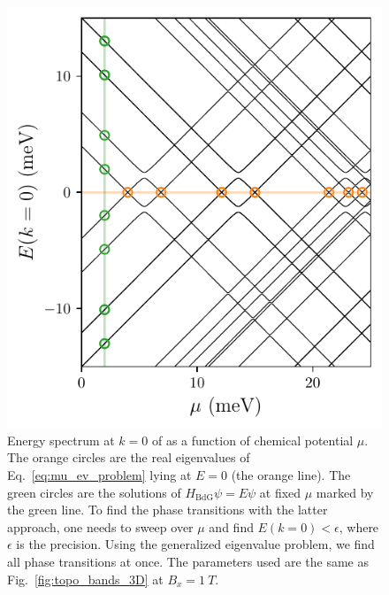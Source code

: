 \begin{figure}[!htb]
\begin{center}
\includegraphics{chapter_introduction/figures/generalized_ev_problem.pdf}
\caption{Energy spectrum at $k=0$ of as a function of chemical potential $\mu$.
The orange circles are the real eigenvalues of Eq.~\eqref{eq:mu_ev_problem} lying at $E=0$ (the orange line).
The green circles are the solutions of $H_\textrm{BdG} \psi = E \psi$ at fixed $\mu$ marked by the green line.
To find the phase transitions with the latter approach, one needs to sweep over $\mu$ and find $E(k=0) < \epsilon$, where $\epsilon$ is the precision.
Using the generalized eigenvalue problem, we find all phase transitions at once.
The parameters used are the same as Fig.~\ref{fig:topo_bands_3D} at $B_x=\SI{1}{T}$.
\label{fig:mu_ev_problem}}
\end{center}
\end{figure}



